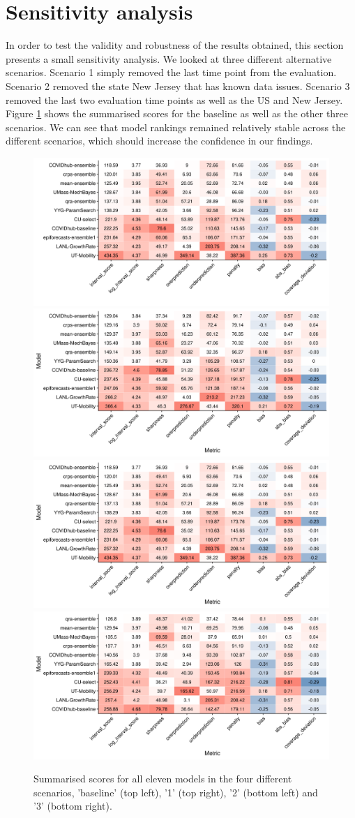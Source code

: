 \documentclass[
]{book}
\begin{document}
\hypertarget{sensitivity}{%
\section{Sensitivity analysis}\label{sensitivity}}

In order to test the validity and robustness of the results obtained, this section presents a small sensitivity analysis. We looked at three different alternative scenarios. Scenario 1 simply removed the last time point from the evaluation. Scenario 2 removed the state New Jersey that has known data issues. Scenario 3 removed the last two evaluation time points as well as the US and New Jersey. Figure \ref{fig:sensitivity} shows the summarised scores for the baseline as well as the other three scenarios. We can see that model rankings remained relatively stable across the different scenarios, which should increase the confidence in our findings.

\begin{figure}
\includegraphics[width=0.5\linewidth]{../visualisation/chapter-5-results/scenario-baseline/coloured-summarised-scores} \includegraphics[width=0.5\linewidth]{../visualisation/chapter-5-results/scenario-1/coloured-summarised-scores} \includegraphics[width=0.5\linewidth]{../visualisation/chapter-5-results/scenario-2/coloured-summarised-scores} \includegraphics[width=0.5\linewidth]{../visualisation/chapter-5-results/scenario-3/coloured-summarised-scores} \caption{Summarised scores for all eleven models in the four different scenarios, 'baseline' (top left), '1' (top right), '2' (bottom left) and '3' (bottom right).}\label{fig:sensitivity}
\end{figure}
\end{document}
